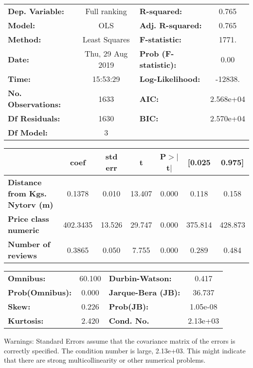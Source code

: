 \documentclass{report}
\begin{document}
\begin{center}
\begin{tabular}{lclc}
\toprule
\textbf{Dep. Variable:}                &   Full ranking   & \textbf{  R-squared:         } &     0.765   \\
\textbf{Model:}                        &       OLS        & \textbf{  Adj. R-squared:    } &     0.765   \\
\textbf{Method:}                       &  Least Squares   & \textbf{  F-statistic:       } &     1771.   \\
\textbf{Date:}                         & Thu, 29 Aug 2019 & \textbf{  Prob (F-statistic):} &     0.00    \\
\textbf{Time:}                         &     15:53:29     & \textbf{  Log-Likelihood:    } &   -12838.   \\
\textbf{No. Observations:}             &        1633      & \textbf{  AIC:               } & 2.568e+04   \\
\textbf{Df Residuals:}                 &        1630      & \textbf{  BIC:               } & 2.570e+04   \\
\textbf{Df Model:}                     &           3      & \textbf{                     } &             \\
\bottomrule
\end{tabular}
\begin{tabular}{lcccccc}
                                       & \textbf{coef} & \textbf{std err} & \textbf{t} & \textbf{P$>$$|$t$|$} & \textbf{[0.025} & \textbf{0.975]}  \\
\midrule
\textbf{Distance from Kgs. Nytorv (m)} &       0.1378  &        0.010     &    13.407  &         0.000        &        0.118    &        0.158     \\
\textbf{Price class numeric}           &     402.3435  &       13.526     &    29.747  &         0.000        &      375.814    &      428.873     \\
\textbf{Number of reviews}             &       0.3865  &        0.050     &     7.755  &         0.000        &        0.289    &        0.484     \\
\bottomrule
\end{tabular}
\begin{tabular}{lclc}
\textbf{Omnibus:}       & 60.100 & \textbf{  Durbin-Watson:     } &    0.417  \\
\textbf{Prob(Omnibus):} &  0.000 & \textbf{  Jarque-Bera (JB):  } &   36.737  \\
\textbf{Skew:}          &  0.226 & \textbf{  Prob(JB):          } & 1.05e-08  \\
\textbf{Kurtosis:}      &  2.420 & \textbf{  Cond. No.          } & 2.13e+03  \\
\bottomrule
\end{tabular}
\end{center}

Warnings: \newline
 [1] Standard Errors assume that the covariance matrix of the errors is correctly specified. \newline
 [2] The condition number is large, 2.13e+03. This might indicate that there are \newline
 strong multicollinearity or other numerical problems.
\end{document}
